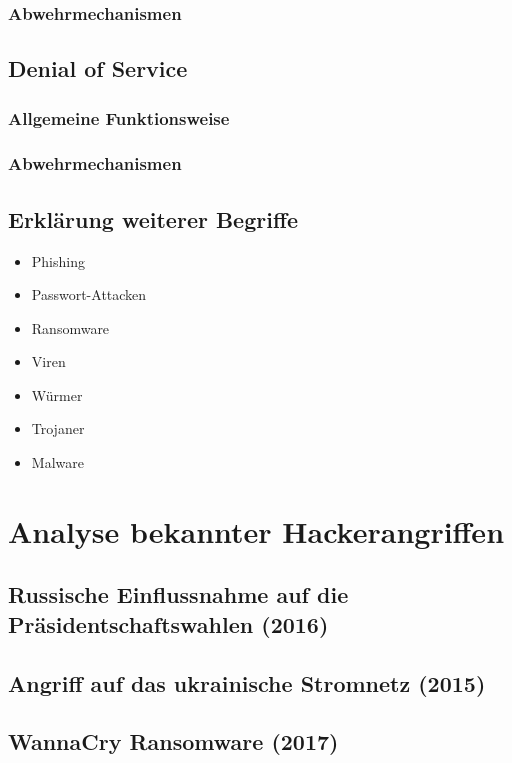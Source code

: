 \documentclass[11pt, a4paper]{article}
\begin{document}
\subsubsection{Abwehrmechanismen}


\subsection{Denial of Service}

\subsubsection{Allgemeine Funktionsweise}

\subsubsection{Abwehrmechanismen}


\subsection{Erklärung weiterer Begriffe}
\begin{itemize}
	\item Phishing
	\item Passwort-Attacken
	\item Ransomware
	\item Viren
	\item Würmer
	\item Trojaner
	\item Malware
\end{itemize}


\section{Analyse bekannter Hackerangriffen}

\subsection{Russische Einflussnahme auf die Präsidentschaftswahlen (2016)}

\subsection{Angriff auf das ukrainische Stromnetz (2015)}

\subsection{WannaCry Ransomware (2017)}
\end{document}
